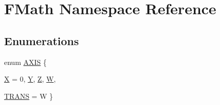 \hypertarget{namespaceFMath}{
\section{FMath Namespace Reference}
\label{namespaceFMath}
}
\subsection*{Enumerations}
\begin{DoxyCompactItemize}
\item 
enum \hyperlink{namespaceFMath_a6cebb48ac4d487860bfb3000dc83464f}{AXIS} \{ \par
\hyperlink{namespaceFMath_a6cebb48ac4d487860bfb3000dc83464fa97075b67af17b9e1e790e1ae7b8ddfea}{X} =  0, 
\hyperlink{namespaceFMath_a6cebb48ac4d487860bfb3000dc83464fa5f8f70917a76852b2c746131d636b37f}{Y}, 
\hyperlink{namespaceFMath_a6cebb48ac4d487860bfb3000dc83464fa2efeab595c04bfae88c455ac09a525fe}{Z}, 
\hyperlink{namespaceFMath_a6cebb48ac4d487860bfb3000dc83464fa0f98577a60c766eb7fcbea869ed2bd60}{W}, 
\par
\hyperlink{namespaceFMath_a6cebb48ac4d487860bfb3000dc83464fa1d8d9e680e2a56fd65804c8177f248f3}{TRANS} =  W
 \}
\end{DoxyCompactItemize}
